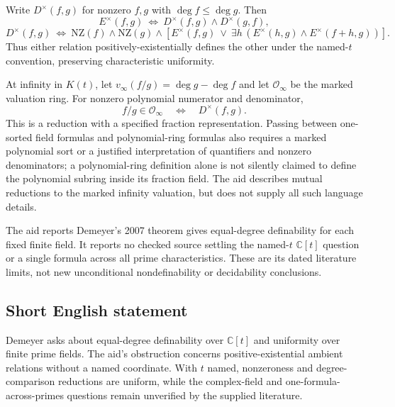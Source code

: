 \documentclass[11pt]{article}
\newcommand{\C}{\mathbb{C}}
\begin{document}
Write $D^\times(f,g)$ for nonzero $f,g$ with $\deg f\le\deg g$. Then
\[
 E^\times(f,g)\ \Longleftrightarrow\
              D^\times(f,g)\wedge D^\times(g,f),
\]
\[
 D^\times(f,g)\ \Longleftrightarrow\
 \mathrm{NZ}(f)\wedge\mathrm{NZ}(g)\wedge
 \left[E^\times(f,g)\ \vee\ \exists h\,
       (E^\times(h,g)\wedge E^\times(f+h,g))\right].
\]
Thus either relation positively-existentially defines the other under the named-$t$ convention, preserving characteristic uniformity.

At infinity in $K(t)$, let $v_\infty(f/g)=\deg g-\deg f$ and let $\mathcal O_\infty$ be the marked valuation ring. For nonzero polynomial numerator and denominator,
\[
 f/g\in\mathcal O_\infty\quad\Longleftrightarrow\quad D^\times(f,g).
\]
This is a reduction with a specified fraction representation. Passing between one-sorted field formulas and polynomial-ring formulas also requires a marked polynomial sort or a justified interpretation of quantifiers and nonzero denominators; a polynomial-ring definition alone is not silently claimed to define the polynomial subring inside its fraction field. The aid describes mutual reductions to the marked infinity valuation, but does not supply all such language details.

The aid reports Demeyer's 2007 theorem gives equal-degree definability for each fixed finite field. It reports no checked source settling the named-$t$ $\C[t]$ question or a single formula across all prime characteristics. These are its dated literature limits, not new unconditional nondefinability or decidability conclusions.
\subsection{Short English statement}
Demeyer asks about equal-degree definability over $\C[t]$ and uniformity over finite prime fields. The aid's obstruction concerns positive-existential ambient relations without a named coordinate. With $t$ named, nonzeroness and degree-comparison reductions are uniform, while the complex-field and one-formula-across-primes questions remain unverified by the supplied literature.
\end{document}
